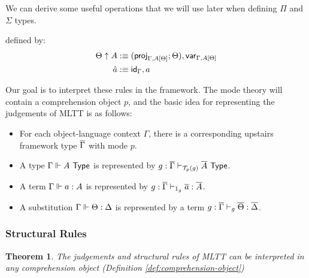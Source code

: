 \documentclass[10pt]{article}
\newtheorem{theorem}{Theorem}
\theoremstyle{definition}
\newcommand{\yields}{\vdash}
\newcommand{\TYPE}{\,\,\mathsf{Type}}
\newcommand{\id}{\mathsf{id}}
\newcommand\El[2]{\mathcal{T}_{#1}(#2)}
\begin{document}
We can derive some useful operations that we will use later when defining $\Pi$ and $\Sigma$ types.
defined by:
\begin{align*}
\Theta \uparrow A &:\equiv (\proj{\Gamma, A[\Theta]}; \Theta) , \qvar{\Gamma, A[\Theta]} \\
\hat{a} &:\equiv \id_{\Gamma} , a
\end{align*}

Our goal is to interpret these rules in the framework. The mode theory will contain a comprehension object $p$, and the basic idea for representing the judgements of MLTT is as follows:

\begin{itemize}
\item For each object-language context $\Gamma$, there is a corresponding upstairs framework type $\overline{\Gamma}$ with mode $p$.

\item A type $\Gamma \qyields A \TYPE$ is represented by $g : \upstairs{\Gamma} \yields_{\El{p}{g}} \upstairs{A} \TYPE$.
  
\item A term $\Gamma \Vdash a : A$ is represented by $g : \upstairs{\Gamma} \yields_{1_g} \upstairs{a} : \upstairs{A}$.

\item A substitution $\Gamma \Vdash \Theta : \Delta$ is represented by a term $g : \upstairs{\Gamma} \yields_g \upstairs{\Theta} : \upstairs{\Delta}$.
\end{itemize}

\subsubsection{Structural Rules}

\begin{theorem}
The judgements and structural rules of MLTT can be interpreted in any comprehension object (Definition \ref{def:comprehension-object})
\end{theorem}
\end{document}
